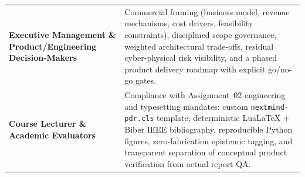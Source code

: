 \noindent
{\footnotesize
\begin{tabularx}{\linewidth}{@{}P{42mm} L@{}}
  \toprule
   &  \\
  \midrule
  \textbf{Executive Management \& Product/Engineering Decision-Makers} & Commercial framing (business model, revenue mechanisms, cost drivers, feasibility constraints), disciplined scope governance, weighted architectural trade-offs, residual cyber-physical risk visibility, and a phased product delivery roadmap with explicit go/no-go gates. \\
  \textbf{Course Lecturer \& Academic Evaluators} & Compliance with Assignment~02 engineering and typesetting mandates: custom \texttt{nextmind-pdr.cls} template, deterministic LuaLaTeX + Biber IEEE bibliography, reproducible Python figures, zero-fabrication epistemic tagging, and transparent separation of conceptual product verification from actual report QA. \\
  \bottomrule
\end{tabularx}
}

\clearpage
